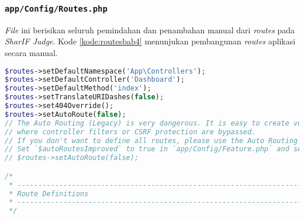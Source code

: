 \subsubsection{\texttt{app/Config/Routes.php}}
\textit{File} ini berisikan seluruh pemindahan dan penambahan manual dari \textit{routes} pada \textit{SharIF Judge}. Kode \ref{kode:routesbab4} menunjukan pembangunan \textit{routes} aplikasi secara manual.
\begin{lstlisting}[language=PHP, caption=Penambahan \textit{routes} yang digunakan pada aplikasi \textit{SharIF Judge}, label=kode:routesbab4]
	$routes->setDefaultNamespace('App\Controllers');
$routes->setDefaultController('Dashboard');
$routes->setDefaultMethod('index');
$routes->setTranslateURIDashes(false);
$routes->set404Override();
$routes->setAutoRoute(false);
// The Auto Routing (Legacy) is very dangerous. It is easy to create vulnerable apps
// where controller filters or CSRF protection are bypassed.
// If you don't want to define all routes, please use the Auto Routing (Improved).
// Set `$autoRoutesImproved` to true in `app/Config/Feature.php` and set the following to true.
// $routes->setAutoRoute(false);

/*
 * --------------------------------------------------------------------
 * Route Definitions
 * --------------------------------------------------------------------
 */


\end{lstlisting}
